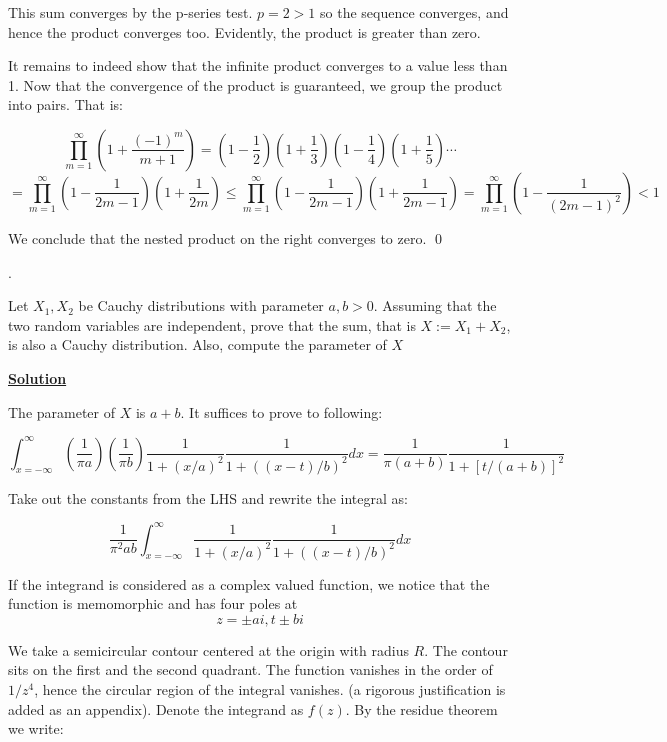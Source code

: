 \documentclass{article}
\newcommand{\new}[1]{
    \vspace{2mm}
    \noindent
    \textbf{
    \underline{#1}}
}
\newcounter{problemcnt}
\newcommand{\Problem}{{
    \vspace{5mm}
    \stepcounter{problemcnt}
    \noindent
    \arabic{problemcnt}. 
}
}
\begin{document}
This sum converges by the p-series test. $p = 2 > 1$ so the 
sequence converges, and hence the product converges too. 
Evidently, the product is greater than zero. 

It remains to indeed show that the infinite product converges to 
a value less than 1. Now that the convergence of the product is 
guaranteed, we group the product into pairs. That is:


\newcommand{\term}[1]{{
    \left(
        1 + \frac{1}{#1}
    \right)
}
}

\newcommand{\nterm}[1]{{
    \left(
        1 - \frac{1}{#1}
    \right)
}
}
\[
    \prod^\infty_{m = 1}\left(1 + \frac{(-1)^m}{m + 1}\right)
    =
    \nterm{2} \term{3} \nterm{4} \term{5} \cdots
\]
\[
    = 
    \prod^\infty_{m = 1}\nterm{2m - 1}\term{2m}
    \leq 
    \prod^\infty_{m = 1}\nterm{2m - 1}\term{2m - 1}
    = 
    \prod^\infty_{m = 1}\nterm{(2m-1)^2} < 1
\]

We conclude that the nested product on the right converges to zero. 
\qed

\newpage

\Problem 

Let $X_1, X_2$ be Cauchy distributions with parameter $a, b > 0$. 
Assuming that the two random variables are independent, prove that 
the sum, that is $X:=X_1+X_2$, is also a Cauchy distribution. 
Also, compute the parameter of $X$

\new{Solution}
The parameter of $X$ is $a + b$. It suffices to prove to following:

\[
    \int_{x = -\infty}^{\infty}
    \left( 
        \frac{1}{\pi a} 
        \right)
\left( 
        \frac{1}{\pi b} 
        \right)
        \frac{1}{1+(x/a)^2}
        \frac{1}{1+((x-t)/b)^2}dx
        =
        \frac{1}{\pi (a+b)}
        \frac{1}{1 + [t/(a+b)]^2}
\]

Take out the constants from the LHS and rewrite the integral as:

\[
    \frac{1}{\pi^2 a b}
    \int_{x = -\infty}^{\infty}
        \frac{1}{1+(x/a)^2}
        \frac{1}{1+((x-t)/b)^2}dx
\]

If the integrand is considered as a complex valued function, 
we notice that the function is memomorphic and has four poles at 
\[
    z = \pm ai, t \pm bi \]

We take a semicircular contour centered at the origin with radius $R$.
The contour sits on the first and the second quadrant.  
The function vanishes in the order of $1/z^4$, hence the circular 
region of the integral vanishes. (a rigorous justification is 
added as an appendix). 
Denote the integrand as $f(z)$.
By the residue theorem we write:
\end{document}
